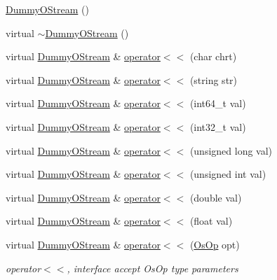 \begin{DoxyCompactItemize}
\hyperlink{classHSF_1_1DummyOStream_a295657be440a5d921ca7e547526e7188}{DummyOStream} ()
\item 
virtual \hyperlink{classHSF_1_1DummyOStream_a525d3b3ad0b0fcf15c630774f9c022ab}{$\sim$DummyOStream} ()
\item 
virtual \hyperlink{classHSF_1_1DummyOStream}{DummyOStream} \& \hyperlink{classHSF_1_1DummyOStream_a2388508ce3a9278f7d0aa4ccfd56f432}{operator$<$$<$} (char chrt)
\item 
virtual \hyperlink{classHSF_1_1DummyOStream}{DummyOStream} \& \hyperlink{classHSF_1_1DummyOStream_ab67a98f5212d00528d5dda50e9858b7b}{operator$<$$<$} (string str)
\item 
virtual \hyperlink{classHSF_1_1DummyOStream}{DummyOStream} \& \hyperlink{classHSF_1_1DummyOStream_a439a7fa1b22a1e7bcc49fa43c686dc0d}{operator$<$$<$} (int64\_\-t val)
\item 
virtual \hyperlink{classHSF_1_1DummyOStream}{DummyOStream} \& \hyperlink{classHSF_1_1DummyOStream_a58e20bb47f254b73898d940bb496ee1f}{operator$<$$<$} (int32\_\-t val)
\item 
virtual \hyperlink{classHSF_1_1DummyOStream}{DummyOStream} \& \hyperlink{classHSF_1_1DummyOStream_a7c3f9f5c2e3a05760819499df1aa6592}{operator$<$$<$} (unsigned long val)
\item 
virtual \hyperlink{classHSF_1_1DummyOStream}{DummyOStream} \& \hyperlink{classHSF_1_1DummyOStream_a9a138ca0d1ea4ebc7b3d699391bb3635}{operator$<$$<$} (unsigned int val)
\item 
virtual \hyperlink{classHSF_1_1DummyOStream}{DummyOStream} \& \hyperlink{classHSF_1_1DummyOStream_a727be32ccd88ccaee0fae2e8d148e9b5}{operator$<$$<$} (double val)
\item 
virtual \hyperlink{classHSF_1_1DummyOStream}{DummyOStream} \& \hyperlink{classHSF_1_1DummyOStream_af27eca0aa6a04ff2a0e86bc668d88dcd}{operator$<$$<$} (float val)
\item 
virtual \hyperlink{classHSF_1_1DummyOStream}{DummyOStream} \& \hyperlink{classHSF_1_1DummyOStream_a7b609938f7a2d4304a463d6164c2ec3b}{operator$<$$<$} (\hyperlink{namespaceHSF_a5c97750573f23c09a9fed0efa5baa52d}{OsOp} opt)
\begin{DoxyCompactList}\small\item\em operator$<$$<$, interface accept OsOp type parameters \item\end{DoxyCompactList}\end{DoxyCompactItemize}


